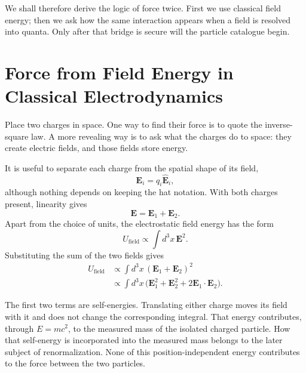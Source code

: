 We shall therefore derive the logic of force twice. First we use classical field energy; then we ask how the same interaction appears when a field is resolved into quanta. Only after that bridge is secure will the particle catalogue begin.

\section{Force from Field Energy in Classical Electrodynamics}

Place two charges in space. One way to find their force is to quote the inverse-square law. A more revealing way is to ask what the charges do to space: they create electric fields, and those fields store energy.

It is useful to separate each charge from the spatial shape of its field,
\begin{equation}
\mathbf E_i=q_i\widehat{\mathbf E}_i,
\end{equation}
although nothing depends on keeping the hat notation. With both charges present, linearity gives
\begin{equation}
\mathbf{E}=\mathbf{E}_1+\mathbf{E}_2.
\end{equation}
Apart from the choice of units, the electrostatic field energy has the form
\begin{equation}
U_{\text{field}}\propto\int d^3x\,\mathbf{E}^2.
\end{equation}
Substituting the sum of the two fields gives
\begin{align}
U_{\text{field}}
&\propto\int d^3x\,(\mathbf{E}_1+\mathbf{E}_2)^2 \\
&\propto\int d^3x\,\bigl(\mathbf{E}_1^2+\mathbf{E}_2^2
  +2\mathbf{E}_1\!\cdot\!\mathbf{E}_2\bigr).
\end{align}

The first two terms are self-energies. Translating either charge moves its field with it and does not change the corresponding integral. That energy contributes, through \(E=mc^2\), to the measured mass of the isolated charged particle. How that self-energy is incorporated into the measured mass belongs to the later subject of renormalization. None of this position-independent energy contributes to the force between the two particles.


